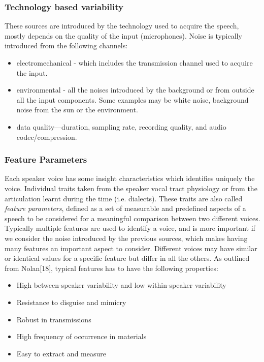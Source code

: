 \begin{itemize}
\subsubsection{Technology based variability}
These sources are introduced by the technology used to acquire
the speech, mostly depends on the quality of the input (microphones).
Noise is typically introduced from the following channels:

\begin{itemize}
    \item electromechanical - which includes the
    transmission channel used to acquire the input.
    \item environmental - all the noises introduced by the background or from
    outside all the input components. Some examples may be white noise, background noise
    from the sun or the environment.
    \item data quality—duration, sampling rate, recording quality, and audio codec/compression.
\end{itemize}

\subsubsection{Feature Parameters}
Each speaker voice has some insight characteristics which identifies uniquely
the voice. Individual traits taken from the speaker vocal tract physiology or
from the articulation learnt during the time (i.e. dialects).
These traits are also called \textit{feature parameters}, defined as a set
of measurable and predefined aspects of a speech to be considered for a meaningful
comparison between two different voices. Typically multiple features
are used to identify a voice, and is more important if we consider the noise introduced by
the previous sources, which makes having many features an important aspect to consider.
Different voices may have similar or identical values for a specific feature but differ in all
the others.
As outlined from Nolan[18], typical features has to have the following properties:
\begin{itemize}
    \item High between-speaker variability and low within-speaker variability
    \item Resistance to disguise and mimicry
    \item Robust in transmissions
    \item High frequency of occurrence in materials
    \item Easy to extract and measure


\end{itemize}
\end{itemize}
